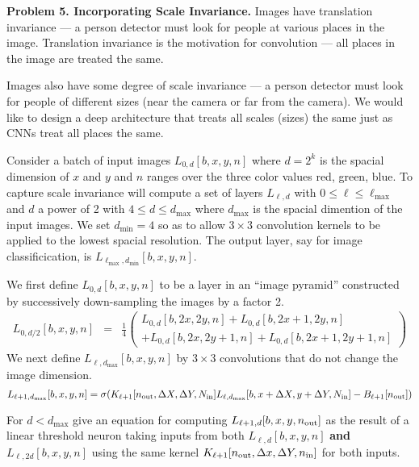 \documentclass{article}
\newcommand{\solution}[1]{}
\begin{document}
\solution{
  $$L_{\ell + 1}[b,x,y,t,\nout] = \sigma(K_{\ell+1}[\nout \Delta X, \Delta Y, \Delta T, \Nin] L_\ell[b, sx+ \Delta X, sy + \Delta Y, st + \Delta T, \Nin]- B[\nout])$$
  }

\bigskip
{\bf Problem 5. Incorporating Scale Invariance.} Images have translation invariance --- a person detector must look for people at
various places in the image.  Translation invariance is the motivation for convolution --- all
places in the image are treated the same.

\medskip
Images also have some degree of scale invariance --- a person detector must look for people of different sizes
(near the camera or far from the camera).  We would like to design a deep architecture that treats all scales (sizes) the same just as CNNs
treat all places the same.

\medskip
Consider a batch of input images
$L_{0,d}[b,x,y,n]$ where $d = 2^k$ is the spacial dimension of $x$ and $y$ and $n$ ranges over the three color values red, green, blue.
To capture scale invariance will compute a set of layers $L_{\ell,d}$ with $0 \leq \ell \leq \ell_{\mathrm{max}}$ and $d$ a power of 2 with $4 \leq d \leq d_{\mathrm{max}}$
where $d_{\mathrm{max}}$ is the spacial dimention of the input images.  We set $d_{\mathrm{min}} = 4$ so as to allow $3\times 3$ convolution kernels to be applied to
the lowest spacial resolution. The output layer, say for image classificication, is $L_{\ell_{\mathrm{max}},d_{\mathrm{min}}}[b,x,y,n]$.

\medskip
We first define $L_{0,d}[b,x,y,n]$
to be a layer in an ``image pyramid'' constructed by successively down-sampling the images by a factor 2.
\begin{eqnarray*}
  L_{0,d/2}[b,x,y,n] & = & \frac{1}{4}\left(\begin{array}{l} L_{0,d}[b,2x,2y,n] + L_{0,d}[b,2x+1,2y,n] \\ + L_{0,d}[b,2x,2y+1,n] + L_{0,d}[b,2x+1,2y+1,n]\end{array}\right)
\end{eqnarray*}
We next define $L_{\ell,d_{\mathrm{max}}}[b,x,y,n]$ by $3\times 3$ convolutions that do not change the image dimension.
{\small  $$L_{\ell+1,d_{\mathrm{max}}}[b,x,y,n] = \sigma(K_{\ell+1}[n_{\mathrm{out}},\Delta X,\Delta Y,N_{\mathrm{in}}]L_{\ell,d_{\mathrm{max}}}[b,x+\Delta X,y+\Delta Y,N_{\mathrm{in}}] - B_{\ell+1}[n_{\mathrm{out}}])$$}

For $d < d_{\mathrm{max}}$ give an equation for computing $L_{\ell+1,d}[b,x,y,n_{\mathrm{out}}]$ as the result of a linear threshold neuron taking inputs from both
$L_{\ell,d}[b,x,y,n]$ {\bf and} $L_{\ell,2d}[b,x,y,n]$ using the same kernel $K_{\ell+1}[n_{\mathrm{out}},\Delta x,\Delta Y,n_{\mathrm{in}}]$ for both inputs.

\solution{
  $$L_{\ell+1,d}[b,x,y,n] = \sigma\left(\begin{array}{ll}
    & K_{\ell+1}[\nout,\Delta X,\Delta Y,\Nin]L_{\ell,d}[b,x+\Delta X,y+\Delta Y,\Nin] \\
    + & K_{\ell+1}[\nout,\Delta X,\Delta Y,\Nin]L_{\ell,2d}[b,2x+\Delta X,2y+\Delta Y,\Nin] \\
    - & B_{\ell+1}[\nout] \end{array}\right)$$
}
\end{document}
